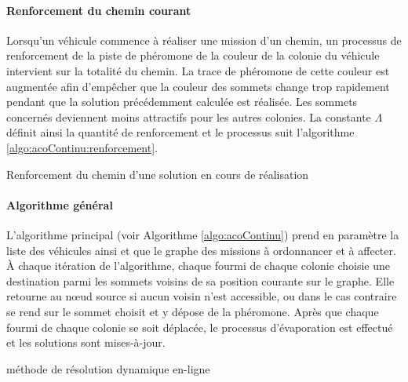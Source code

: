 \paragraph{Renforcement du chemin courant}

Lorsqu'un véhicule commence à réaliser une mission d'un chemin, un processus de renforcement de la piste de phéromone de la couleur de la colonie du véhicule intervient sur la totalité du chemin. La trace de phéromone de cette couleur est augmentée afin d'empêcher que la couleur des sommets change trop rapidement pendant que la solution précédemment calculée est réalisée. Les sommets concernés deviennent moins attractifs pour les autres colonies. La constante $\Lambda$ définit ainsi la quantité de renforcement et le processus suit l'algorithme \ref{algo:acoContinu:renforcement}.

\begin{algorithm}[H]

\caption{Renforcement du chemin d'une solution en cours de réalisation}
\label{algo:acoContinu:renforcement}
\end{algorithm}

\paragraph{Algorithme général}

L'algorithme principal (voir Algorithme \ref{algo:acoContinu}) prend en paramètre la liste des véhicules ainsi et que le graphe des missions à ordonnancer et à affecter. À chaque itération de l'algorithme, chaque fourmi de chaque colonie choisie une destination parmi les sommets voisins de sa position courante sur le graphe. Elle retourne au n\oe{}ud source si aucun voisin n'est accessible, ou dans le cas contraire se rend sur le sommet choisit et y dépose de la phéromone. Après que chaque fourmi de chaque colonie se soit déplacée, le processus d'évaporation est effectué et les solutions sont mises-à-jour.

\begin{algorithm}[H]
\caption{méthode de résolution dynamique en-ligne}
\label{algo:acoContinu}
\end{algorithm}

